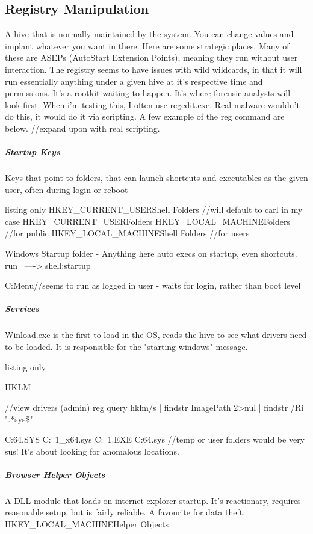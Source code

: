 \subsection{Registry Manipulation}
A hive that is normally maintained by the system. You can change values and implant whatever you want in there. Here are some strategic places. 
Many of these are ASEPs (AutoStart Extension Points), meaning they run without user interaction. The registry seems to have issues with wild wildcards, 
in that it will run essentially anything under a given hive at it's respective time and permissions. It's a rootkit waiting to happen. 
It's where forensic analysts will look first. When i'm testing this, I often use regedit.exe. Real malware wouldn't do this, it would do it via scripting. 
A few example of the reg command are below. 
//expand upon with real scripting.


\subparagraph{Startup Keys}
Keys that point to folders, that can launch shortcuts and executables as the given user, often during login or reboot
\begin{tcblisting}{listing only}
HKEY_CURRENT_USER\Software\Microsoft\Windows\CurrentVersion\Explorer\User Shell Folders //will default to carl in my case
HKEY_CURRENT_USER\Software\Microsoft\Windows\CurrentVersion\Explorer\Shell Folders
HKEY_LOCAL_MACHINE\SOFTWARE\Microsoft\Windows\CurrentVersion\Explorer\Shell Folders //for public
HKEY_LOCAL_MACHINE\SOFTWARE\Microsoft\Windows\CurrentVersion\Explorer\User Shell Folders  //for users

Windows Startup folder - Anything here auto execs on startup, even shortcuts. run  ----> shell:startup

C:\Users\USERNAME\AppData\Roaming\Microsoft\Windows\Start Menu\Programs\Startup //seems to run as logged in user - waits for login, rather than boot level

\end{tcblisting}


\subparagraph{Services}
Winload.exe is the first to load in the OS, reads the hive to see what drivers need to be loaded. It is responsible for the "starting windows" message.
\begin{tcblisting}{listing only}

HKLM\SYSTEM\CurrentControlSet\Services

//view drivers (admin)
reg query hklm\system\currentcontrolset\services /s | findstr ImagePath 2>nul | findstr /Ri ".*\.sys\$"

C:\WINDOWS\TEMP\INSTB64.SYS C:\Users\USERNA~1\AppData\Local\Temp{}_x64.sys C:\Windows\TEMP{}~1.EXE C:\Users\username\AppData\Local\Temp\ALSysIO64.sys
//temp or user folders would be very sus! It's about looking for anomalous locations.



\subparagraph{Browser Helper Objects}
A DLL module that loads on internet explorer startup. It's reactionary, requires reasonable setup, but is fairly reliable. A favourite for data theft.
HKEY_LOCAL_MACHINE\SOFTWARE\Microsoft\Windows\CurrentVersion\Explorer\Browser Helper Objects
\end{tcblisting}

